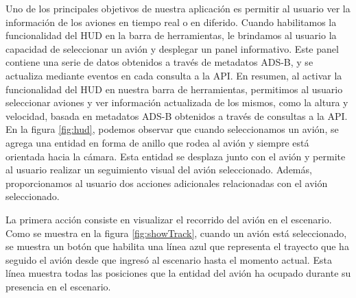 \documentclass[a4paper, 11pt]{book}
\begin{document}
Uno de los principales objetivos de nuestra aplicación es permitir al usuario ver la información de los aviones en tiempo real o en diferido. Cuando habilitamos la funcionalidad del \textsc{\gls{HUD}} en la barra de herramientas, le brindamos al usuario la capacidad de seleccionar un avión y desplegar un panel informativo. Este panel contiene una serie de datos obtenidos a través de metadatos \textsc{ADS-B}, y se actualiza mediante eventos en cada consulta a la \textsc{API}.
En resumen, al activar la funcionalidad del \textsc{\gls{HUD}} en nuestra barra de herramientas, permitimos al usuario seleccionar aviones y ver información actualizada de los mismos, como la altura y velocidad, basada en metadatos \textsc{ADS-B} obtenidos a través de consultas a la \textsc{API}.
En la figura \ref{fig:hud}, podemos observar que cuando seleccionamos un avión, se agrega una entidad en forma de anillo que rodea al avión y siempre está orientada hacia la cámara. Esta entidad se desplaza junto con el avión y permite al usuario realizar un seguimiento visual del avión seleccionado. Además, proporcionamos al usuario dos acciones adicionales relacionadas con el avión seleccionado.

La primera acción consiste en visualizar el recorrido del avión en el escenario. Como se muestra en la figura \ref{fig:showTrack}, cuando un avión está seleccionado, se muestra un botón que habilita una línea azul que representa el trayecto que ha seguido el avión desde que ingresó al escenario hasta el momento actual. Esta línea muestra todas las posiciones que la entidad del avión ha ocupado durante su presencia en el escenario.
\end{document}
